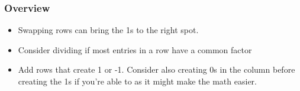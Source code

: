 \documentclass[12pt]{scrartcl}
\begin{document}
    \subsubsection*{Overview}
    \begin{itemize}
        \item Swapping rows can bring the 1s to the right spot.
        \item Consider dividing if most entries in a row have a common factor
        \item Add rows that create 1 or -1. Consider also creating 0s in the column before creating the 1s if you're able to as it might make the math easier.
    \end{itemize}
\end{document}

